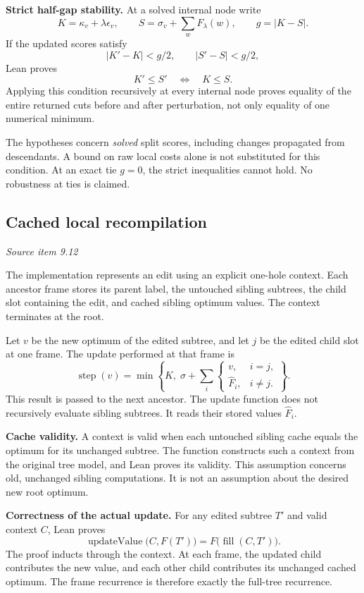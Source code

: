 \textbf{Strict half-gap stability.} At a solved internal node write
\[
K=\kappa_v+\lambda\epsilon_v,\qquad
S=\sigma_v+\sum_wF_\lambda(w),\qquad g=|K-S|.
\]
If the updated scores satisfy
\[
|K'-K|<g/2,\qquad |S'-S|<g/2,
\]
Lean proves
\[
K'\leq S'\quad\Longleftrightarrow\quad K\leq S.
\]
Applying this condition recursively at every internal node proves equality of the entire returned cuts before and after perturbation, not only equality of one numerical minimum.

The hypotheses concern \emph{solved} split scores, including changes propagated from descendants. A bound on raw local costs alone is not substituted for this condition. At an exact tie $g=0$, the strict inequalities cannot hold. No robustness at ties is claimed.



\subsection{Cached local recompilation}\label{supp2:subsection:003}\textit{Source item 9.12}\par
The implementation represents an edit using an explicit one-hole context. Each ancestor frame stores its parent label, the untouched sibling subtrees, the child slot containing the edit, and cached sibling optimum values. The context terminates at the root.

Let $v$ be the new optimum of the edited subtree, and let $j$ be the edited child slot at one frame. The update performed at that frame is
\[
\boxed{
\operatorname{step}(v)=
\min\left\{K,\;\sigma+
\sum_i\begin{cases}
v,&i=j,\\
\widehat F_i,&i\ne j.
\end{cases}\right\}.
}
\]
This result is passed to the next ancestor. The update function does not recursively evaluate sibling subtrees. It reads their stored values $\widehat F_i$.

\textbf{Cache validity.} A context is valid when each untouched sibling cache equals the optimum for its unchanged subtree. The function  constructs such a context from the original tree model, and Lean proves its validity. This assumption concerns old, unchanged sibling computations. It is not an assumption about the desired new root optimum.

\textbf{Correctness of the actual update.} For any edited subtree $T'$ and valid context $C$, Lean proves
\[
\operatorname{updateValue}\bigl(C,F(T')\bigr)=F\bigl(\operatorname{fill}(C,T')\bigr).
\]
The proof inducts through the context. At each frame, the updated child contributes the new value, and each other child contributes its unchanged cached optimum. The frame recurrence is therefore exactly the full-tree recurrence.

